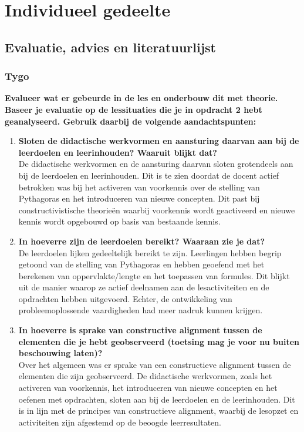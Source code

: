 \documentclass{article}
\begin{document}
    \section{Individueel gedeelte}
        \subsection{Evaluatie, advies en literatuurlijst}
            \subsubsection{Tygo}
                \textbf{Evalueer wat er gebeurde in de les en onderbouw dit met theorie. Baseer je evaluatie op de lessituaties die je in opdracht 2 hebt geanalyseerd. Gebruik daarbij de volgende aandachtspunten: }
                \begin{enumerate}[label=(\alph*)]
                    \item \textbf{Sloten de didactische werkvormen en aansturing daarvan aan bij de leerdoelen en leerinhouden? Waaruit blijkt dat?} \\
                
                        De didactische werkvormen en de aansturing daarvan sloten grotendeels aan bij de leerdoelen en leerinhouden. Dit is te zien doordat de docent actief betrokken was bij het activeren van voorkennis over de stelling van Pythagoras en het introduceren van nieuwe concepten. Dit past bij constructivistische theorieën waarbij voorkennis wordt geactiveerd en nieuwe kennis wordt opgebouwd op basis van bestaande kennis.
                
                    \item \textbf{In hoeverre zijn de leerdoelen bereikt? Waaraan zie je dat?} \\
                
                        De leerdoelen lijken gedeeltelijk bereikt te zijn. Leerlingen hebben begrip getoond van de stelling van Pythagoras en hebben geoefend met het berekenen van oppervlakte/lengte en het toepassen van formules. Dit blijkt uit de manier waarop ze actief deelnamen aan de lesactiviteiten en de opdrachten hebben uitgevoerd. Echter, de ontwikkeling van probleemoplossende vaardigheden had meer nadruk kunnen krijgen.
                
                    \item \textbf{In hoeverre is sprake van constructive alignment tussen de elementen die je hebt geobserveerd (toetsing mag je voor nu buiten beschouwing laten)?} \\

                        Over het algemeen was er sprake van een constructieve alignment tussen de elementen die zijn geobserveerd. De didactische werkvormen, zoals het activeren van voorkennis, het introduceren van nieuwe concepten en het oefenen met opdrachten, sloten aan bij de leerdoelen en de leerinhouden. Dit is in lijn met de principes van constructieve alignment, waarbij de lesopzet en activiteiten zijn afgestemd op de beoogde leerresultaten.
                
                \end{enumerate}
\end{document}

